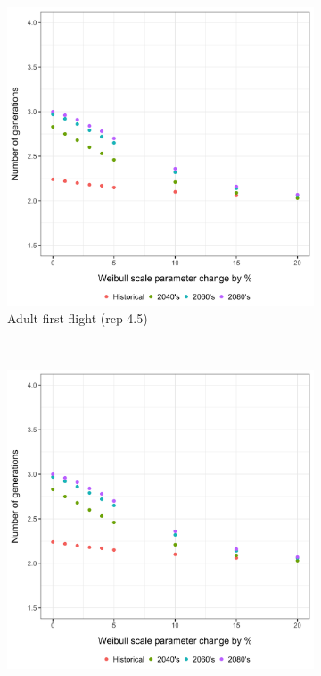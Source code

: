 \documentclass[12pt]{article}
\theoremstyle{plain}
\theoremstyle{definition}
\theoremstyle{definition}
\begin{document}
\begin{figure}[h!]
    \hspace{.1in}
    \begin{subfigure}[b]{0.5\textwidth}
        \includegraphics[width=\textwidth]{figures/rcp45_Adult_Aug_scale_sens}
        \caption{Adult first flight (rcp 4.5)}
        \label{fig:aff_45}
    \end{subfigure}
     \hspace{-.1in}
    ~ %
    \begin{subfigure}[b]{0.5\textwidth}
        \includegraphics[width=\textwidth]{figures/rcp45_Adult_Aug_scale_sens}

\end{subfigure}
\end{figure}
\end{document}
